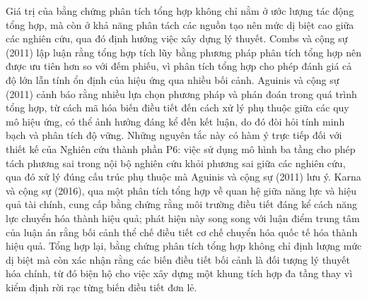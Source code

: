 \documentclass[
  a4paper,
  13pt]{extreport}
\begin{document}
Giá trị của bằng chứng phân tích tổng hợp không chỉ nằm ở ước lượng tác
động tổng hợp, mà còn ở khả năng phân tách các nguồn tạo nên mức dị biệt
cao giữa các nghiên cứu, qua đó định hướng việc xây dựng lý thuyết.
Combs và cộng sự (2011) lập luận rằng tổng hợp tích lũy bằng phương pháp
phân tích tổng hợp nên được ưu tiên hơn so với đếm phiếu, vì phân tích
tổng hợp cho phép đánh giá cả độ lớn lẫn tính ổn định của hiệu ứng qua
nhiều bối cảnh. Aguinis và cộng sự (2011) cảnh báo rằng nhiều lựa chọn
phương pháp và phán đoán trong quá trình tổng hợp, từ cách mã hóa biến
điều tiết đến cách xử lý phụ thuộc giữa các quy mô hiệu ứng, có thể ảnh
hưởng đáng kể đến kết luận, do đó đòi hỏi tính minh bạch và phân tích độ
vững. Những nguyên tắc này có hàm ý trực tiếp đối với thiết kế của
Nghiên cứu thành phần P6: việc sử dụng mô hình ba tầng cho phép tách
phương sai trong nội bộ nghiên cứu khỏi phương sai giữa các nghiên cứu,
qua đó xử lý đúng cấu trúc phụ thuộc mà Aguinis và cộng sự (2011) lưu ý.
Karna và cộng sự (2016), qua một phân tích tổng hợp về quan hệ giữa năng
lực và hiệu quả tài chính, cung cấp bằng chứng rằng môi trường điều tiết
đáng kể cách năng lực chuyển hóa thành hiệu quả; phát hiện này song song
với luận điểm trung tâm của luận án rằng bối cảnh thể chế điều tiết cơ
chế chuyển hóa quốc tế hóa thành hiệu quả. Tổng hợp lại, bằng chứng phân
tích tổng hợp không chỉ định lượng mức dị biệt mà còn xác nhận rằng các
biến điều tiết bối cảnh là đối tượng lý thuyết hóa chính, từ đó biện hộ
cho việc xây dựng một khung tích hợp đa tầng thay vì kiểm định rời rạc
từng biến điều tiết đơn lẻ.
\end{document}
